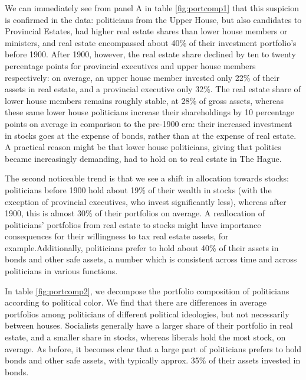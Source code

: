    We can immediately see from panel A in table \ref{fig:portcomp1} that this suspicion is confirmed in the data: politicians from the Upper House, but also candidates to Provincial Estates, had higher real estate shares than lower house members or ministers, and real estate encompassed about 40\% of their investment portfolio's before 1900. After 1900, however, the real estate share declined by ten to twenty percentage points for provincial executives and upper house members respectively: on average, an upper house member invested only 22\% of their assets in real estate, and a provincial executive only 32\%. The real estate share of lower house members remains roughly stable, at 28\% of gross assets, whereas these same lower house politicians increase their shareholdings by 10 percentage points on average in comparison to the pre-1900 era: their increased investment in stocks goes at the expense of bonds, rather than at the expense of real estate. A practical reason might be that lower house politicians, giving that politics became increasingly demanding, had to hold on to real estate in The Hague.
    
    The second noticeable trend is that we see a shift in allocation towards stocks: politicians before 1900 hold about 19\% of their wealth in stocks (with the exception of provincial executives, who invest significantly less), whereas after 1900, this is almost 30\% of their portfolios on average. A reallocation of politicians' portfolios from real estate to stocks might have importance consequences for their willingness to tax real estate assets, for example.Additionally, politicians prefer to hold about 40\% of their assets in bonds and other safe assets, a number which is consistent across time and across politicians in various functions. 
    
    In table \ref{fig:portcomp2}, we decompose the portfolio composition of politicians according to political color. We find that there are differences in average portfolios among politicians of different political ideologies, but not necessarily between houses. Socialists generally have a larger share of their portfolio in real estate, and a smaller share in stocks, whereas liberals hold the most stock, on average. As before, it becomes clear that a large part of politicians prefers to hold bonds and other safe assets, with typically approx. 35\% of their assets invested in bonds. 
    
